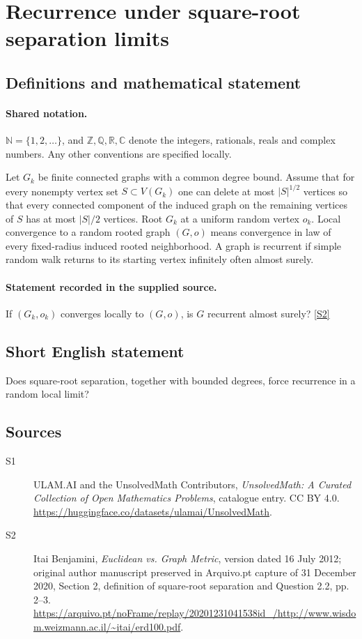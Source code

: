 \documentclass[11pt]{article}
\newcommand{\sref}[2]{\hyperlink{source:#1:#2}{[S#2]}}
\begin{document}
\section{Recurrence under square-root separation limits}\label{statement}

\subsection{Definitions and mathematical statement}

\paragraph{Shared notation.}$\mathbb N=\{1,2,\ldots\}$, and $\mathbb Z,\mathbb Q,\mathbb R,\mathbb C$ denote the integers, rationals, reals and complex numbers. Any other conventions are specified locally.


Let $G_k$ be finite connected graphs with a common degree bound. Assume that for every nonempty vertex set $S\subset V(G_k)$ one can delete at most $|S|^{1/2}$ vertices so that every connected component of the induced graph on the remaining vertices of $S$ has at most $|S|/2$ vertices. Root $G_k$ at a uniform random vertex $o_k$. Local convergence to a random rooted graph $(G,o)$ means convergence in law of every fixed-radius induced rooted neighborhood. A graph is recurrent if simple random walk returns to its starting vertex infinitely often almost surely.
\paragraph{Statement recorded in the supplied source.}
If $(G_k,o_k)$ converges locally to $(G,o)$, is $G$ recurrent almost surely? \sref{statement}{2}
\subsection{Short English statement}
Does square-root separation, together with bounded degrees, force recurrence in a random local limit?
\subsection{Sources}
\begin{description}
\item[\hypertarget{source:statement:1}{S1}] ULAM.AI and the UnsolvedMath Contributors, \emph{UnsolvedMath: A Curated Collection of Open Mathematics Problems}, catalogue entry. CC BY 4.0. \url{https://huggingface.co/datasets/ulamai/UnsolvedMath}.
\item[\hypertarget{source:statement:2}{S2}] Itai Benjamini, \emph{Euclidean vs. Graph Metric}, version dated 16 July 2012; original author manuscript preserved in Arquivo.pt capture of 31 December 2020, Section 2, definition of square-root separation and Question 2.2, pp. 2--3. \url{https://arquivo.pt/noFrame/replay/20201231041538id_/http://www.wisdom.weizmann.ac.il/~itai/erd100.pdf}.
\end{description}
\label{end:statement}
\end{document}
